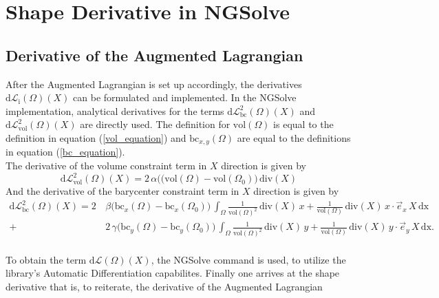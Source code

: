 
\section{Shape Derivative in NGSolve}\label{shape_der_chapter}
\subsection{Derivative of the Augmented Lagrangian}

After the Augmented Lagrangian is set up accordingly, the derivatives $\mathrm{d}\mathcal{L}_{\mathrm{i}}(\Omega)(X)$ can be formulated and implemented.
In the NGSolve implementation, analytical derivatives for the terms $\mathrm{d}\mathcal{L}^2_{\mathrm{bc}}(\Omega)(X)$ 
and $\mathrm{d}\mathcal{L}^2_{\mathrm{vol}}(\Omega)(X)$ are directly used. The definition for $\mathrm{vol}(\Omega)$ is equal to
the definition in equation (\ref{vol_equation}) and $\mathrm{bc}_{x,y}(\Omega)$ are equal to the definitions in equation (\ref{bc_equation}).\\

The derivative of the volume constraint term in $X$ direction is given by
\begin{equation}\label{eq:constraints_vol}
	\mathrm{d}\mathcal{L}^2_{\mathrm{vol}}(\Omega)(X) = 2 \, \alpha \Big( (\mathrm{vol}(\Omega) - \mathrm{vol}(\Omega_0) \Big) \, \mathrm{div}(X)
\end{equation}
And the derivative of the barycenter constraint term in $X$ direction is given by
\begin{equation}\label{eq:constraints_bc}
	\begin{aligned}
	\mathrm{d}\mathcal{L}^2_{\mathrm{bc}}(\Omega)(X) =
	2& \, \beta \Big( \mathrm{bc}_x(\Omega) - \mathrm{bc}_x(\Omega_0) \Big) \, \int_{\Omega} \frac{1}{\mathrm{vol}(\Omega)^2} \, \mathrm{div}(X) \, x 
	+ \frac{1}{\mathrm{vol}(\Omega)} \, \mathrm{div}(X) \, x \cdot \vec{e}_x \, X \, \mathrm{dx} \\
	+& \, 2 \, \gamma \Big( \mathrm{bc}_y(\Omega) - \mathrm{bc}_y(\Omega_0) \Big) \, \int_{\Omega} \frac{1}{\mathrm{vol}(\Omega)^2} \, \mathrm{div}(X) \, y 
	+ \frac{1}{\mathrm{vol}(\Omega)} \, \mathrm{div}(X) \, y \cdot \vec{e}_y \, X\, \mathrm{dx}.
	\end{aligned}
\end{equation}
\\
To obtain the term $\mathrm{d}\mathcal{L}(\Omega)(X)$, the NGSolve command  is used, to utilize the library's Automatic Differentiation
capabilites. Finally one arrives at the shape derivative that is, to reiterate, the derivative of the Augmented Lagrangian

